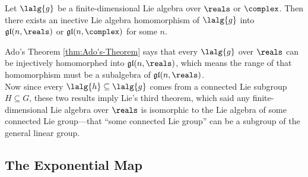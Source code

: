 \documentclass[../main.tex]{subfiles}
\begin{document}
\newpage
\begin{theorem}
\label{thm:Ado's-Theorem}
    Let \(\lalg{g}\) be a finite-dimensional Lie algebra over \(\reals\)
    or \(\complex\). Then there exists an inective Lie algebra
    homomorphism of \(\lalg{g}\) into \(\gl{n}{\reals}\) or
    \(\gl{n}{\complex}\) for some \(n\).
\end{theorem}
\begin{remark}
    Ado's Theorem \cref{thm:Ado's-Theorem} says that every \(\lalg{g}\)
    over \(\reals\) can be injectively homomorphed into
    \(\gl{n}{\reals}\), which means the range of that homomorphism must
    be a subalgebra of \(\gl{n}{\reals}\).\\
    Now since every \(\lalg{h} \subseteq \lalg{g}\) comes from a
    connected Lie subgroup \(H \subseteq G\), these two results imply
    Lie's third theorem, which said any finite-dimensional Lie algebra
    over \(\reals\) is isomorphic to the Lie algebra of some connected
    Lie group---that ``some connected Lie group'' can be a subgroup of
    the general linear group.
\end{remark}
\subsection{The Exponential Map}
\end{document}
